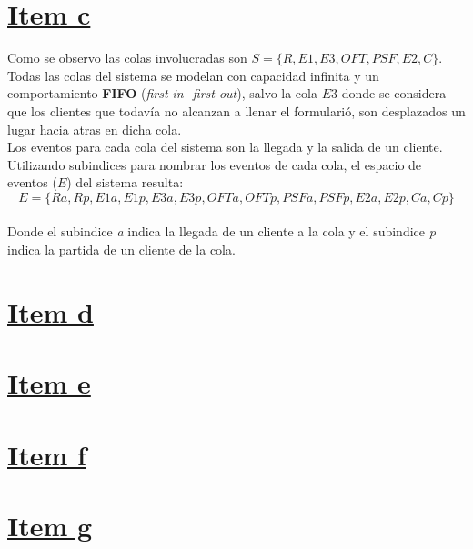 \documentclass[a4paper,10pt]{article}
\begin{document}
\section*{\underline{Item c}}
Como se observo las colas involucradas son $S = \{R, E1, E3, OFT, PSF, E2, C\}$.\\
Todas las colas del sistema se modelan con capacidad infinita y un comportamiento \textbf{FIFO} (\textit{first in- first out}), salvo la cola $E3$ 
donde se considera que los clientes que todav\'ia no alcanzan a llenar el formulari\'o, son desplazados un lugar hacia atras en dicha cola.\\
Los eventos para cada cola del sistema son la llegada y la salida de un cliente.
Utilizando subindices para nombrar los eventos de cada cola, el espacio de eventos ($E$) del sistema resulta:\\
$$E = \{Ra , Rp , E1a , E1p , E3a , E3p , OFTa , OFTp , PSFa , PSFp , E2a , E2p , Ca , Cp \}$$\\
Donde el subindice \textit{a} indica la llegada de un cliente a la cola y el subindice \textit{p} indica la partida de un cliente de la cola.

\section*{\underline{Item d}}
\section*{\underline{Item e}}
\section*{\underline{Item f}}
\section*{\underline{Item g}}
\end{document}
